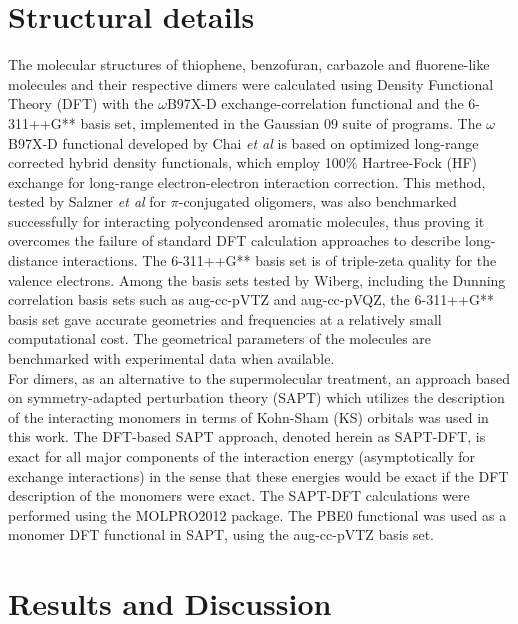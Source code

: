 	
	\section{Structural details}
	
	The molecular structures of thiophene, benzofuran, carbazole and fluorene-like molecules and their respective dimers were calculated using Density Functional Theory (DFT) with the $\omega$B97X-D exchange-correlation functional and the   6-311++G** basis set, implemented in the Gaussian 09 suite of programs. The $\omega$B97X-D functional developed by Chai \textit{et al}\cite{chai2008systematic} is based on optimized long-range corrected hybrid density functionals, which employ 100\% Hartree-Fock (HF) exchange for long-range electron-electron interaction correction. This method, tested by Salzner \textit{et al}\cite{salzner2011improved} for $\pi$-conjugated oligomers, was also benchmarked successfully for interacting polycondensed aromatic molecules,\cite{spillebout2014discerning} thus proving it overcomes the failure of standard DFT calculation approaches to describe long-distance interactions. The 6-311++G** basis set is of triple-zeta quality for the valence electrons. Among the basis sets tested by Wiberg,\cite{wiberg2004basis} including the Dunning correlation basis sets such as aug-cc-pVTZ and aug-cc-pVQZ, the 6-311++G** basis set gave accurate geometries and frequencies at a relatively small computational cost. The geometrical parameters of the molecules are benchmarked with experimental data when available.\\
	
	
	For dimers, as an alternative to the supermolecular treatment, an approach based on symmetry-adapted perturbation theory (SAPT)\cite{jeziorski1994perturbation} which utilizes the description of the interacting monomers in terms of Kohn-Sham (KS) orbitals was used in this work. The DFT-based SAPT approach,\cite{hesselmann2005density} denoted herein as SAPT-DFT, is exact for all major components of the interaction energy (asymptotically for exchange interactions) in the sense that these energies would be exact if the DFT description of the monomers were exact. The SAPT-DFT calculations were performed using the MOLPRO2012 package.\cite{MOLPRO_brief} The PBE0 functional\cite{adamo1999toward} was used as a monomer DFT functional in SAPT, using the aug-cc-pVTZ basis set. 
	
\section{Results and Discussion}


